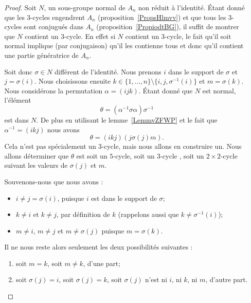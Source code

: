 \begin{proof}
	Soit \( N\), un sous-groupe normal de \( A_n\) non réduit à l'identité. Étant donné que les \( 3\)-cycles engendrent \( A_n\) (proposition~\ref{PropsHlmvv}) et que tous les \( 3\)-cycles sont conjugués dans \( A_n\) (proposition~\ref{PropiodtBG}), il suffit de montrer que \( N\) contient un \( 3\)-cycle. En effet si \( N\) contient un \( 3\)-cycle, le fait qu'il soit normal implique (par conjugaison) qu'il les contienne tous et donc qu'il contient une partie génératrice de \( A_n\).

	Soit donc \( \sigma\in N\) différent de l'identité. Nous prenons \( i\) dans le support de \( \sigma\) et \( j=\sigma(i)\). Nous choisissons ensuite \( k\in\{ 1,\ldots, n \}\setminus\{ i,j,\sigma^{-1}(i) \}\) et \( m=\sigma(k)\). Nous considérons la permutation \( \alpha=(ijk)\). Étant donné que \( N\) est normal, l'élément
	\begin{equation}
		\theta=(\alpha^{-1}\sigma\alpha)\sigma^{-1}
	\end{equation}
	est dans \( N\). De plus en utilisant le lemme~\ref{LemmvZFWP} et le fait que \( \alpha^{-1}=(ikj)\) nous avons
	\begin{equation}
		\theta=(ikj)(j\sigma(j)m).
	\end{equation}
	Cela n'est pas spécialement un \( 3\)-cycle, mais nous allons en construire un. Nous allons déterminer que \( \theta\) est soit un \( 5\)-cycle, soit un \( 3\)-cycle , soit un \( 2\times 2\)-cycle suivant les valeurs de \( \sigma(j)\) et \( m\).

	Souvenons-nous que nous avons :
	\begin{itemize}
		\item
		      \( i \neq j = \sigma(i) \), puisque \( i\) est dans le support de \( \sigma \);
		\item
		      \( k \neq i \) et \( k \neq j \), par définition de \( k\) (rappelons aussi que \( k \neq \sigma^{-1}(i) \));
		\item
		      \( m \neq i \), \( m \neq j \) et \( m \neq  \sigma(j) \) puisque \( m = \sigma(k) \).
	\end{itemize}
	Il ne nous reste alors seulement les deux possibilités suivantes :
	\begin{enumerate}
		\item
		      soit \( m=k\), soit \( m \neq k \), d'une part;
		\item
		      soit \( \sigma(j) = i \), soit \( \sigma(j) = k \), soit \( \sigma(j) \) n'est ni \( i\), ni \( k\), ni \( m\), d'autre part.
	\end{enumerate}


\end{proof}
